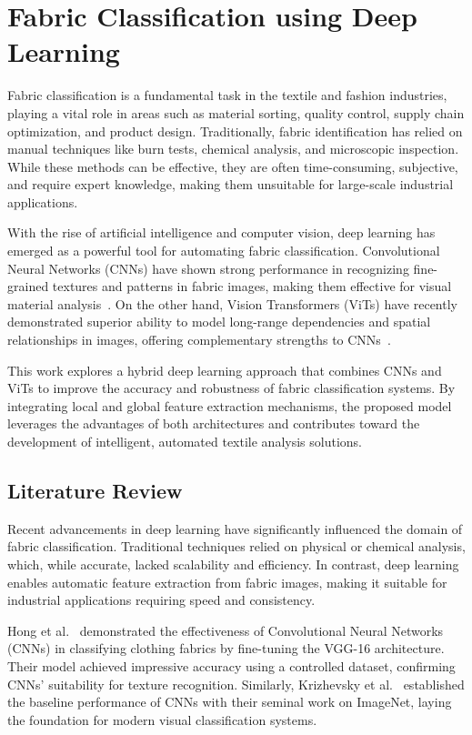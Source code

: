 \chapter{Fabric Classification using Deep Learning}

Fabric classification is a fundamental task in the textile and fashion industries, playing a vital role in areas such as material sorting, quality control, supply chain optimization, and product design. Traditionally, fabric identification has relied on manual techniques like burn tests, chemical analysis, and microscopic inspection. While these methods can be effective, they are often time-consuming, subjective, and require expert knowledge, making them unsuitable for large-scale industrial applications.

With the rise of artificial intelligence and computer vision, deep learning has emerged as a powerful tool for automating fabric classification. Convolutional Neural Networks (CNNs) have shown strong performance in recognizing fine-grained textures and patterns in fabric images, making them effective for visual material analysis~\cite{hong2020cnn, krizhevsky2012imagenet}. On the other hand, Vision Transformers (ViTs) have recently demonstrated superior ability to model long-range dependencies and spatial relationships in images, offering complementary strengths to CNNs~\cite{dosovitskiy2020vit, chitra2022vit}.

This work explores a hybrid deep learning approach that combines CNNs and ViTs to improve the accuracy and robustness of fabric classification systems. By integrating local and global feature extraction mechanisms, the proposed model leverages the advantages of both architectures and contributes toward the development of intelligent, automated textile analysis solutions.

\section*{Literature Review}

Recent advancements in deep learning have significantly influenced the domain of fabric classification. Traditional techniques relied on physical or chemical analysis, which, while accurate, lacked scalability and efficiency. In contrast, deep learning enables automatic feature extraction from fabric images, making it suitable for industrial applications requiring speed and consistency.

Hong et al.~\cite{hong2020cnn} demonstrated the effectiveness of Convolutional Neural Networks (CNNs) in classifying clothing fabrics by fine-tuning the VGG-16 architecture. Their model achieved impressive accuracy using a controlled dataset, confirming CNNs’ suitability for texture recognition. Similarly, Krizhevsky et al.~\cite{krizhevsky2012imagenet} established the baseline performance of CNNs with their seminal work on ImageNet, laying the foundation for modern visual classification systems.

